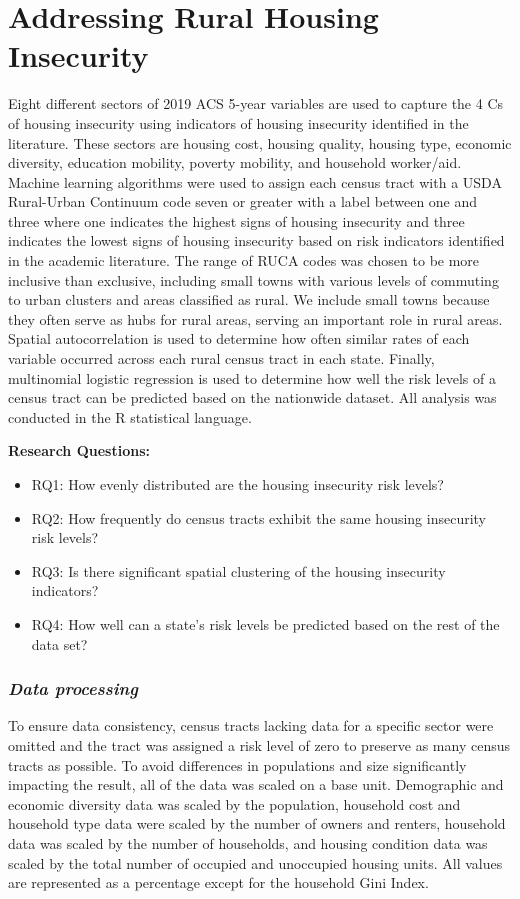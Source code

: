 \chapter{Addressing Rural Housing Insecurity}	%
Eight different sectors of 2019 ACS 5-year variables are used to capture the 4 Cs of housing insecurity using indicators of housing insecurity identified in the literature. These sectors are housing cost, housing quality, housing type, economic diversity, education mobility, poverty mobility, and household worker/aid. Machine learning algorithms were used to assign each census tract with a USDA Rural-Urban Continuum code seven or greater with a label between one and three where one indicates the highest signs of housing insecurity and three indicates the lowest signs of housing insecurity based on risk indicators identified in the academic literature. The range of RUCA codes was chosen to be more inclusive than exclusive, including small towns with various levels of commuting to urban clusters and areas classified as rural. We include small towns because they often serve as hubs for rural areas, serving an important role in rural areas. Spatial autocorrelation is used to determine how often similar rates of each variable occurred across each rural census tract in each state. Finally, multinomial logistic regression is used to determine how well the risk levels of a census tract can be predicted based on the nationwide dataset.  All analysis was conducted in the R statistical language.  

\textbf{Research Questions:}
\begin{itemize}
    \item RQ1: How evenly distributed are the housing insecurity risk levels?
    \item RQ2: How frequently do census tracts exhibit the same housing insecurity risk levels?
    \item RQ3: Is there significant spatial clustering of the housing insecurity indicators?
    \item RQ4: How well can a state’s risk levels be predicted based on the rest of the data set?
\end{itemize}

\subsection{\textit{Data processing}}

To ensure data consistency, census tracts lacking data for a specific sector were omitted and the tract was assigned a risk level of zero to preserve as many census tracts as possible. To avoid differences in populations and size significantly impacting the result, all of the data was scaled on a base unit. Demographic and economic diversity data was scaled by the population, household cost and household type data were scaled by the number of owners and renters, household data was scaled by the number of households, and housing condition data was scaled by the total number of occupied and unoccupied housing units. All values are represented as a percentage except for the household Gini Index.  

